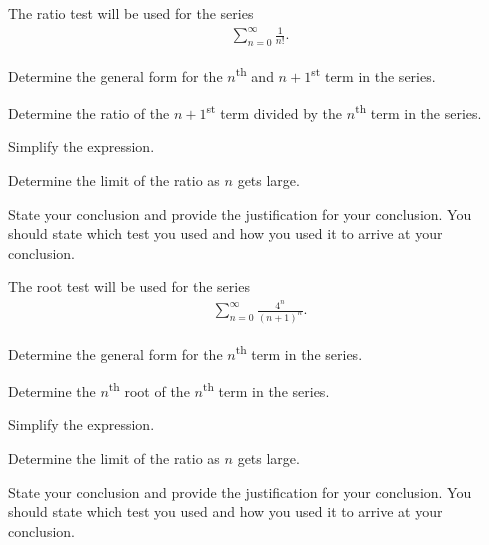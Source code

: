 \begin{problem}

  \item The ratio test will be used for the series
  \begin{eqnarray*}
    \sum^\infty_{n=0} \frac{1}{n!}.
  \end{eqnarray*}
  \begin{subproblem}
    \item Determine the general form for the $n$\textsuperscript{th} and $n+1$\textsuperscript{st} term in the series.
      \vfill
    \item Determine the ratio of the $n+1$\textsuperscript{st} term
      divided by the $n$\textsuperscript{th} term in the series.
      \vfill
    \item Simplify the expression.
      \vfill
    \item Determine the limit of the ratio as $n$ gets large.
      \vfill
    \item State your conclusion and provide the justification for your conclusion. You should state which test you used and how you used it to arrive at your conclusion.
      \vfill
  \end{subproblem}

  \clearpage

  \item The root test will be used for the series
  \begin{eqnarray*}
    \sum^\infty_{n=0} \frac{4^n}{(n+1)^n}.
  \end{eqnarray*}
  \begin{subproblem}
    \item Determine the general form for the $n$\textsuperscript{th} term in the series.
      \vfill
    \item Determine the $n$\textsuperscript{th} root of the $n$\textsuperscript{th}  term in the series.
      \vfill
    \item Simplify the expression.
      \vfill
    \item Determine the limit of the ratio as $n$ gets large.
      \vfill
    \item State your conclusion and provide the justification for your conclusion. You should state which test you used and how you used it to arrive at your conclusion.
      \vfill
  \end{subproblem}

\clearpage


\end{problem}
